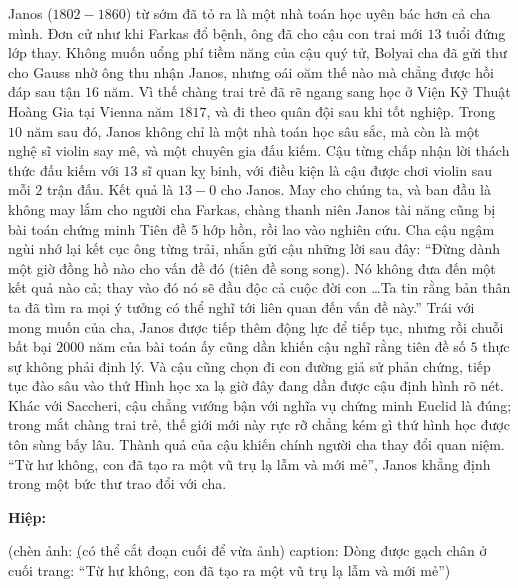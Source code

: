 \begin{multicols}{2}
	
	Janos ($1802-1860$) từ sớm đã tỏ ra là một nhà toán học uyên bác hơn cả cha mình. Đơn cử như khi Farkas đổ bệnh, ông đã cho cậu con trai mới $13$ tuổi đứng lớp thay. Không muốn uổng phí tiềm năng của cậu quý tử, Bolyai cha đã gửi thư cho Gauss nhờ ông thu nhận Janos, nhưng oái oăm thế nào mà chẳng được hồi đáp sau tận $16$ năm. Vì thế chàng trai trẻ đã rẽ ngang sang học ở Viện Kỹ Thuật Hoàng Gia tại Vienna năm $1817$, và đi theo quân đội sau khi tốt nghiệp. Trong $10$ năm sau đó, Janos không chỉ là một nhà toán học sâu sắc, mà còn là một nghệ sĩ violin say mê, và một chuyên gia đấu kiếm. Cậu từng chấp nhận lời thách thức đấu kiếm với $13$ sĩ quan kỵ binh, với điều kiện là cậu được chơi violin sau mỗi $2$ trận đấu. Kết quả là $13-0$ cho Janos.
	\vskip 0.1cm
	May cho chúng ta, và ban đầu là không may lắm cho người cha Farkas, chàng thanh niên Janos tài năng cũng bị bài toán chứng minh Tiên đề $5$ hớp hồn, rồi lao vào nghiên cứu. Cha cậu ngậm ngùi nhớ lại kết cục ông từng trải, nhắn gửi cậu những lời sau đây:
	\vskip 0.1cm
	``Đừng dành một giờ đồng hồ nào cho vấn đề đó (tiên đề song song). Nó không đưa đến một kết quả nào cả; thay vào đó nó sẽ đầu độc cả cuộc đời con \ldots Ta tin rằng bản thân ta đã tìm ra mọi ý tưởng có thể nghĩ tới liên quan đến vấn đề này.''
	\vskip 0.1cm
	Trái với mong muốn của cha, Janos được tiếp thêm động lực để tiếp tục, nhưng rồi chuỗi bất bại $2000$ năm của bài toán ấy cũng dần khiến cậu nghĩ rằng tiên đề số $5$ thực sự không phải định lý. Và cậu cũng chọn đi con đường giả sử phản chứng, tiếp tục đào sâu vào thứ Hình học xa lạ giờ đây đang dần được cậu định hình rõ nét. Khác với Saccheri, cậu chẳng vướng bận với nghĩa vụ chứng minh Euclid là đúng; trong mắt chàng trai trẻ, thế giới mới này rực rỡ chẳng kém gì thứ hình học được tôn sùng bấy lâu. Thành quả của cậu khiến chính người cha thay đổi quan niệm. ``Từ hư không, con đã tạo ra một vũ trụ lạ lẫm và mới mẻ'', Janos khẳng định trong một bức thư trao đổi với cha. 
	
\textbf{Hiệp: }

(chèn ảnh: \href{https://mathshistory.st-andrews.ac.uk/Diagrams/Bolyai_letter_2.jpeg} 
(có thể cắt đoạn cuối để vừa ảnh)
caption: Dòng được gạch chân ở cuối trang: “Từ hư không, con đã tạo ra một vũ trụ lạ lẫm và mới mẻ”)
	

\end{multicols}
